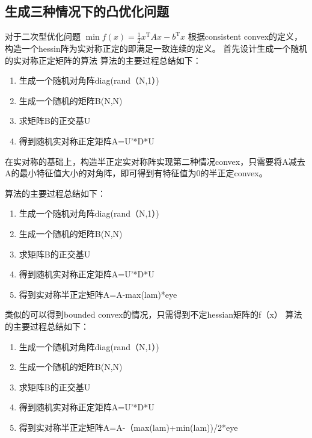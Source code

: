 \documentclass[UTF8]{ctexart}
\begin{document}
\subsection{生成三种情况下的凸优化问题}

对于二次型优化问题 $\min f(x)=\frac{1}{2} x^{\mathrm{T}} A x-b^{\mathrm{T}} x$ 根据consistent convex的定义，构造一个hessin阵为实对称正定的即满足一致连续的定义。
\vspace{3mm}
首先设计生成一个随机的实对称正定矩阵的算法
算法的主要过程总结如下：
\begin{enumerate}
	\item 生成一个随机对角阵diag(rand（N,1）)
	\item 生成一个随机的矩阵B(N,N)
	\item 求矩阵B的正交基U
	\item 得到随机实对称正定矩阵A=U'*D*U
\end{enumerate}

在实对称的基础上，构造半正定实对称阵实现第二种情况convex，只需要将A减去A的最小特征值大小的对角阵，即可得到有特征值为0的半正定convex。

算法的主要过程总结如下：
\begin{enumerate}
	\item 生成一个随机对角阵diag(rand（N,1）)
	\item 生成一个随机的矩阵B(N,N)
	\item 求矩阵B的正交基U
	\item 得到随机实对称正定矩阵A=U'*D*U
  \item 得到实对称半正定矩阵A=A-max(lam)*eye
\end{enumerate}

类似的可以得到bounded convex的情况，只需得到不定hessian矩阵的f（x）
算法的主要过程总结如下：
\begin{enumerate}
	\item 生成一个随机对角阵diag(rand（N,1）)
	\item 生成一个随机的矩阵B(N,N)
	\item 求矩阵B的正交基U
	\item 得到随机实对称正定矩阵A=U'*D*U
  \item 得到实对称半正定矩阵A=A-（max(lam)+min(lam))/2*eye
\end{enumerate}
\end{document}
